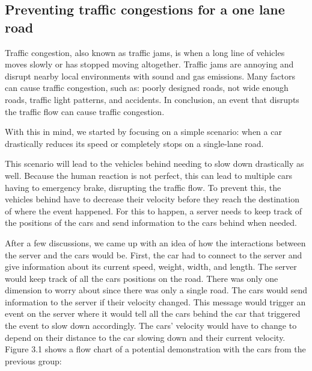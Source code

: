 \subsection{Preventing traffic congestions for a one lane road}

Traffic congestion, also known as traffic jams, is when a long line of vehicles moves slowly or has stopped moving altogether. Traffic jams are annoying and disrupt nearby local environments with sound and gas emissions. Many factors can cause traffic congestion, such as:
poorly designed roads, not wide enough roads, traffic light patterns, and accidents. In conclusion, an event that disrupts the traffic flow can cause traffic congestion.

With this in mind, we started by focusing on a simple scenario: when a car drastically reduces its speed or completely stops on a single-lane road. 

This scenario will lead to the vehicles behind needing to slow down drastically as well. Because the human reaction is not perfect, this can lead to multiple cars having to emergency brake, disrupting the traffic flow. To prevent this, the vehicles behind have to decrease their velocity before they reach the destination of where the event happened. For this to happen, a server needs to keep track of the positions of the cars and send information to the cars behind when needed. 

After a few discussions, we came up with an idea of how the interactions between the server and the cars would be. First, the car had to connect to the server and give information about its current speed, weight, width, and length. The server would keep track of all the cars positions on the road. There was only one dimension to worry about since there was only a single road. The cars would send information to the server if their velocity changed. This message would trigger an event on the server where it would tell all the cars behind the car that triggered the event to slow down accordingly. The cars' velocity would have to change to depend on their distance to the car slowing down and their current velocity. Figure 3.1 shows a flow chart of a potential demonstration with the cars from the previous group:

